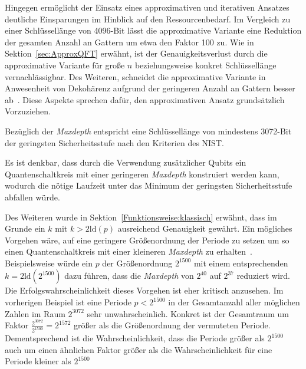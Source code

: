 Hingegen ermöglicht der Einsatz eines approximativen und iterativen Ansatzes deutliche Einsparungen im Hinblick auf den Ressourcenbedarf. 
Im Vergleich zu einer Schlüssellänge von 4096-Bit lässt die approximative Variante eine Reduktion der gesamten Anzahl an Gattern um etwa den Faktor 100 zu. 
Wie in Sektion~\ref{sec:ApproxQFT} erwähnt, ist der Genauigkeitsverlust durch die approximative Variante für große \(n\) beziehungsweise konkret Schlüssellänge vernachlässigbar. 
Des Weiteren, schneidet die approximative Variante in Anwesenheit von Dekohärenz aufgrund der geringeren Anzahl an Gattern besser ab~\cite{Barenco_1996}. 
Diese Aspekte sprechen dafür, den approximativen Ansatz grundsätzlich Vorzuziehen.

\vspace{1em}

Bezüglich der \textit{Maxdepth} entspricht eine Schlüssellänge von mindestens 3072-Bit der geringsten Sicherheitsstufe nach den Kriterien des NIST. 

Es ist denkbar, dass durch die Verwendung zusätzlicher Qubits ein Quantenschaltkreis mit einer geringeren \textit{Maxdepth} konstruiert werden kann, 
wodurch die nötige Laufzeit unter das Minimum der geringsten Sicherheitsstufe abfallen würde.

Des Weiteren wurde in Sektion~\ref{Funktionsweise:klassisch} erwähnt, 
dass im Grunde ein \(k\) mit \(k > 2\text{ld}(p)\) ausreichend Genauigkeit gewährt. 
Ein mögliches Vorgehen wäre, 
auf eine geringere Größenordnung der Periode zu setzen um so einen Quantenschaltkreis mit einer kleineren \textit{Maxdepth} zu erhalten~\cite{Shor_1997}. 
Beispielsweise würde ein \(p\) der Größenordnung \(2^{1500}\) mit einem entsprechenden \(k = 2\text{ld}(2^{1500})\) dazu führen, 
dass die \textit{Maxdepth} von \(2^{40}\) auf \(2^{37}\) reduziert wird. 
Die Erfolgswahrscheinlichkeit dieses Vorgehen ist eher kritisch anzusehen. 
Im vorherigen Beispiel ist eine Periode \(p<2^{1500}\) in der Gesamtanzahl aller möglichen Zahlen im Raum \(2^{3072}\) sehr unwahrscheinlich. 
Konkret ist der Gesamtraum um Faktor \(\frac{2^{3072}}{2^{1500}} = 2^{1572}\) größer als die Größenordnung der vermuteten Periode.  
Dementsprechend ist die Wahrscheinlichkeit, 
dass die Periode größer als \(2^{1500}\) auch um einen ähnlichen Faktor größer als die Wahrscheinlichkeit für eine Periode kleiner als \(2^{1500}\)




